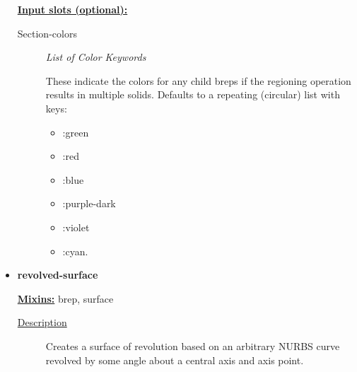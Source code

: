 \documentclass [11pt]{book}
\begin{document}
\begin{itemize}
\textbf{
\underline{Input slots (optional):}}

\begin{description}

\item [Section-colors]
\emph{List of Color Keywords}

 These indicate the colors for any child breps if the regioning operation results in
multiple solids. Defaults to a repeating (circular) list with keys:


\begin{itemize}

\item  :green 

\item  :red 

\item  :blue 

\item  :purple-dark 

\item  :violet 

\item  :cyan. 

\end{itemize}





\end{description}







\item {}
\label{prim:revolved-surface}
\textbf{revolved-surface}


\textbf{
\underline{Mixins:}} brep, surface





\begin{description}

\item [
\underline{Description}]


Creates a surface of revolution based on an arbitrary NURBS curve revolved by some angle about
a central axis and axis point.



\end{description}




\begin{figure}
\begin{lrbox}{\boxedverb}
\begin{minipage}{\linewidth}
{\small

}
\end{minipage}
\end{lrbox}
\end{figure}
\end{itemize}
\end{document}
